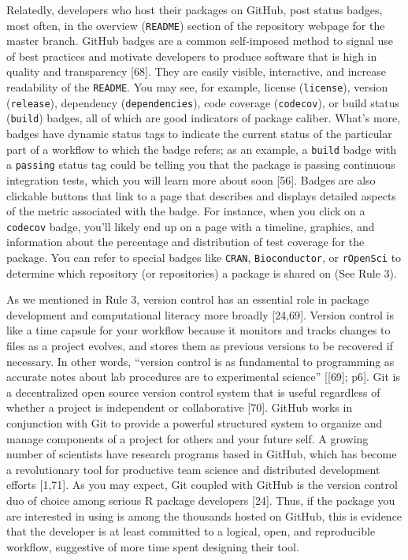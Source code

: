 \documentclass[10pt,letterpaper]{article}
\begin{document}
Relatedly, developers who host their packages on GitHub, post status
badges, most often, in the overview (\texttt{README}) section of the
repository webpage for the master branch. GitHub badges are a common
self-imposed method to signal use of best practices and motivate
developers to produce software that is high in quality and transparency
{[}68{]}. They are easily visible, interactive, and increase readability
of the \texttt{README}. You may see, for example, license
(\texttt{license}), version (\texttt{release}), dependency
(\texttt{dependencies}), code coverage (\texttt{codecov}), or build
status (\texttt{build}) badges, all of which are good indicators of
package caliber. What's more, badges have dynamic status tags to
indicate the current status of the particular part of a workflow to
which the badge refers; as an example, a \texttt{build} badge with a
\texttt{passing} status tag could be telling you that the package is
passing continuous integration tests, which you will learn more about
soon {[}56{]}. Badges are also clickable buttons that link to a page
that describes and displays detailed aspects of the metric associated
with the badge. For instance, when you click on a \texttt{codecov}
badge, you'll likely end up on a page with a timeline, graphics, and
information about the percentage and distribution of test coverage for
the package. You can refer to special badges like \texttt{CRAN},
\texttt{Bioconductor}, or \texttt{rOpenSci} to determine which
repository (or repositories) a package is shared on (See Rule 3).

As we mentioned in Rule 3, version control has an essential role in
package development and computational literacy more broadly {[}24,69{]}.
Version control is like a time capsule for your workflow because it
monitors and tracks changes to files as a project evolves, and stores
them as previous versions to be recovered if necessary. In other words,
``version control is as fundamental to programming as accurate notes
about lab procedures are to experimental science'' {[}{[}69{]}; p6{]}.
Git is a decentralized open source version control system that is useful
regardless of whether a project is independent or collaborative
{[}70{]}. GitHub works in conjunction with Git to provide a powerful
structured system to organize and manage components of a project for
others and your future self. A growing number of scientists have
research programs based in GitHub, which has become a revolutionary tool
for productive team science and distributed development efforts
{[}1,71{]}. As you may expect, Git coupled with GitHub is the version
control duo of choice among serious R package developers {[}24{]}. Thus,
if the package you are interested in using is among the thousands hosted
on GitHub, this is evidence that the developer is at least committed to
a logical, open, and reproducible workflow, suggestive of more time
spent designing their tool.
\end{document}

